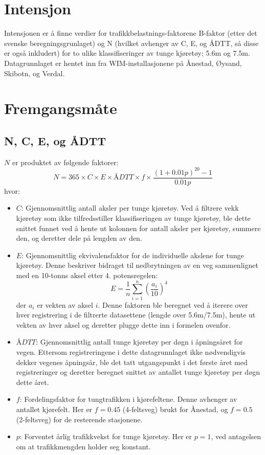 \section{Intensjon}
Intensjonen er å finne verdier for trafikkbelastnings-faktorene B-faktor (etter det svenske beregningsgrunlaget) 
og N (hvilket avhenger av C, E, og ÅDTT, så disse er også inkludert) for to ulike klassifiseringer av tunge kjøretøy; 5.6m og 7.5m.
Datagrunnlaget er hentet inn fra WIM-installasjonene på Ånestad, Øysand, Skibotn, og Verdal. 


\section{Fremgangsmåte}
\subsection{N, C, E, og ÅDTT}
\(N\) er produktet av følgende faktorer:
\[
N = 365 \times C \times E \times ÅDTT \times f \times \frac{(1 + 0.01p)^{20} - 1}{0.01p}
\]
hvor:
\begin{itemize}
    \item \(C\): Gjennomsnittlig antall aksler per tunge kjøretøy. 
    Ved å filtrere vekk kjøretøy som ikke tilfredsstiller klassifiseringen av tunge kjøretøy, 
    ble dette snittet funnet ved å hente ut kolonnen for antall aksler per kjøretøy, summere den, og deretter dele på lengden av den.
    \item \(E\): Gjennomsnittlig ekvivalensfaktor for de individuelle akslene for tunge kjøretøy. Denne beskriver bidraget til nedbrytningen av en veg sammenlignet med en 10-tonns aksel etter 4. potensregelen:
    \[
    E = \frac{1}{n} \sum_{i=1}^{n} \left(\frac{a_i}{10}\right)^4
    \]
    der \(a_i\) er vekten av aksel \(i\). Denne faktoren ble beregnet ved å iterere over hver registrering i de filtrerte datasettene (lengde over 5.6m/7.5m), 
    hente ut vekten av hver aksel og deretter plugge dette inn i formelen ovenfor.
    \item \(ÅDTT\): Gjennomsnittlig antall tunge kjøretøy per døgn i åpningsåret for vegen. Ettersom registreringene i dette datagrunnlaget ikke nødvendigvis dekker vegenes åpningsår, ble det tatt utgangspunkt i det første året med registreringer og deretter beregnet snittet av antallet tunge kjøretøy per døgn dette året.
    \item \(f\): Fordelingsfaktor for tungtrafikken i kjørefeltene. Denne avhenger av antallet kjørefelt. Her er \(f = 0.45\) (4-feltsveg) brukt for Ånestad, og \(f = 0.5\) (2-feltsveg) for de resterende stasjonene.
    \item \(p\): Forventet årlig trafikkvekst for tunge kjøretøy. Her er \(p = 1\), ved antagelsen om at trafikkmengden holder seg konstant.
\end{itemize}

